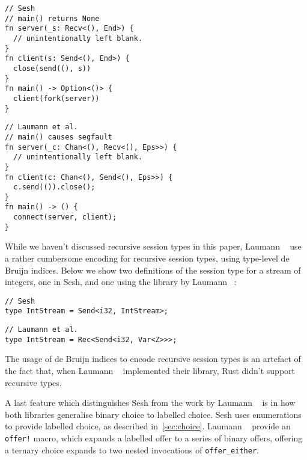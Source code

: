 \documentclass[copyright,creativecommons]{eptcs}
\begin{document}
\vspace{-0.5\baselineskip}
\begin{minipage}[t]{0.5\linewidth}
\begin{lstlisting}
// Sesh
// main() returns None
fn server(_s: Recv<(), End>) {
  // unintentionally left blank.
}
fn client(s: Send<(), End>) {
  close(send((), s))
}
fn main() -> Option<()> {
  client(fork(server))
}
\end{lstlisting}
\end{minipage}%
\begin{minipage}[t]{0.5\linewidth}
\begin{lstlisting}
// Laumann et al.
// main() causes segfault
fn server(_c: Chan<(), Recv<(), Eps>>) {
  // unintentionally left blank.
}
fn client(c: Chan<(), Send<(), Eps>>) {
  c.send(()).close();
}
fn main() -> () {
  connect(server, client);
}
\end{lstlisting}
\end{minipage}
\vspace{-0.25\baselineskip}

While we haven't discussed recursive session types in this paper, Laumann \etal~\cite{jespersen2015} use a rather cumbersome encoding for recursive session types, using type-level de Bruijn indices. Below we show two definitions of the session type for a stream of integers, one in Sesh, and one using the library by Laumann \etal~\cite{jespersen2015}:

\begin{minipage}{0.5\linewidth}
\begin{lstlisting}
// Sesh
type IntStream = Send<i32, IntStream>;
\end{lstlisting}
\end{minipage}%
\begin{minipage}{0.5\linewidth}
\begin{lstlisting}
// Laumann et al.
type IntStream = Rec<Send<i32, Var<Z>>>;
\end{lstlisting}
\end{minipage}
\vspace{-0.25\baselineskip}

\noindent
The usage of de Bruijn indices to encode recursive session types is an artefact of the fact that, when Laumann \etal~\cite{jespersen2015} implemented their library, Rust didn't support recursive types.

A last feature which distinguishes Sesh from the work by Laumann \etal~\cite{jespersen2015} is in how both libraries generalise binary choice to labelled choice. Sesh uses enumerations to provide labelled choice, as described in~\cref{sec:choice}. Laumann \etal~\cite{jespersen2015} provide an \lstinline{offer!} macro, which expands a labelled offer to a series of binary offers, \eg offering a ternary choice expands to two nested invocations of \lstinline{offer_either}.
\end{document}
